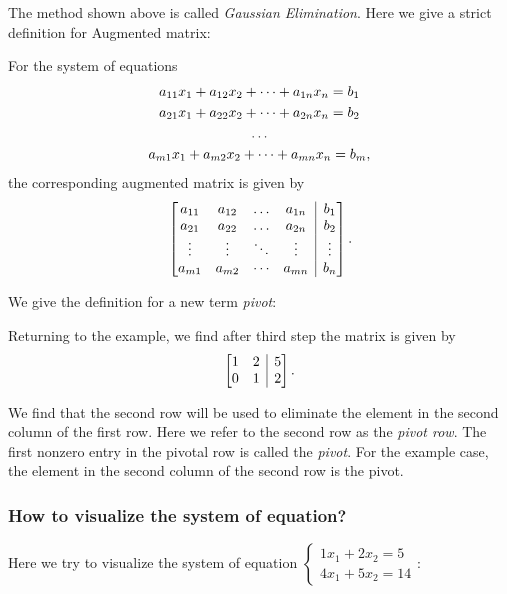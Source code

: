 The method shown above is called \emph{Gaussian Elimination}. Here we give a strict definition for Augmented matrix:
\begin{definition}
For the system of equations
\begin{gather}
a_{11}x_1 + a_{12}x_2 + \dots + a_{1n}x_n = b_1 \notag \\ 
a_{21}x_1 + a_{22}x_2 + \dots + a_{2n}x_n = b_2 \notag \\
\dots 	\notag 	\\
a_{m1}x_1 + a_{m2}x_2 + \dots + a_{mn}x_n = b_m , \label{eq:linear system equations_2}
\end{gather}
the corresponding augmented matrix is given by 
\[
\left[
\begin{array}{@{}cccc|c@{}}
a_{11} & a_{12} & \dots & a_{1n} &  b_1 \\
a_{21} & a_{22} & \dots & a_{2n} &  b_2 \\
\vdots    & \vdots    & \ddots & \vdots    & \vdots \\
a_{m1} & a_{m2} & \cdots & a_{mn} &   b_n
\end{array}
\right].
\]
\end{definition}

We give the definition for a new term \emph{pivot}:
\begin{definition}[pivot]
Returning to the example, we find after third step the matrix is given by 
\[
\left[
\begin{array}{@{}cc|c@{}}
1 & 2 & 5 \\
0 & 1 & 2
\end{array}
\right].
\]

We find that the second row will be used to eliminate the element in the second column of the first row. Here we refer to the second row as the \emph{pivot
row}. The first nonzero entry in the pivotal row is called the \emph{pivot}. For the example case, the element in the second column of the second row is the pivot.
\end{definition}

\subsubsection{How to visualize the system of equation?}
Here we try to visualize the system of equation $
\left \{	\begin{gathered}
1x_1 + 2x_2 =5	\\
4x_1 + 5x_2 = 14 
\end{gathered}	\right.$:

